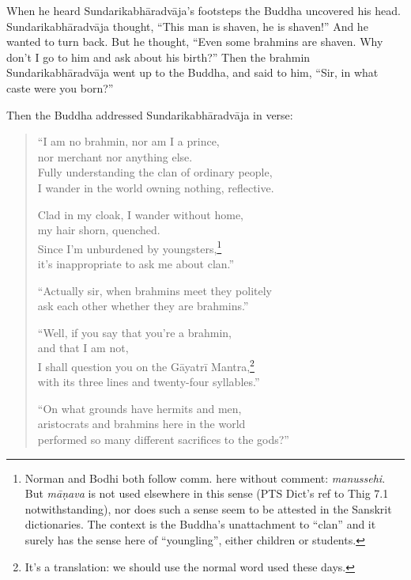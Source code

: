 \documentclass[12pt,openany]{book}%
\begin{document}
When he heard \textsanskrit{Sundarikabhāradvāja}’s footsteps the Buddha uncovered his head. \textsanskrit{Sundarikabhāradvāja} thought, “This man is shaven, he is shaven!” And he wanted to turn back. But he thought, “Even some brahmins are shaven. Why don’t I go to him and ask about his birth?” Then the brahmin \textsanskrit{Sundarikabhāradvāja} went up to the Buddha, and said to him, “Sir, in what caste were you born?” 

Then the Buddha addressed \textsanskrit{Sundarikabhāradvāja} in verse: 

\begin{verse}%
“I am no brahmin, nor am I a prince, \\
nor merchant nor anything else. \\
Fully understanding the clan of ordinary people, \\
I wander in the world owning nothing, reflective. 

Clad in my cloak, I wander without home, \\
my hair shorn, quenched. \\
Since I’m unburdened by youngsters,\footnote{Norman and Bodhi both follow comm. here without comment: \textit{manussehi}. But \textit{\textsanskrit{māṇava}} is not used elsewhere in this sense (PTS Dict’s ref to Thig 7.1 notwithstanding), nor does such a sense seem to be attested in the Sanskrit dictionaries. The context is the Buddha’s unattachment to “clan” and it surely has the sense here of “youngling”, either children or students. } \\
it’s inappropriate to ask me about clan.” 

“Actually sir, when brahmins meet they politely \\
ask each other whether they are brahmins.” 

“Well, if you say that you’re a brahmin, \\
and that I am not, \\
I shall question you on the \textsanskrit{Gāyatrī} Mantra,\footnote{It’s a translation: we should use the normal word used these days. } \\
with its three lines and twenty-four syllables.” 

“On what grounds have hermits and men, \\
aristocrats and brahmins here in the world \\
performed so many different sacrifices to the gods?” 


\end{verse}
\end{document}
